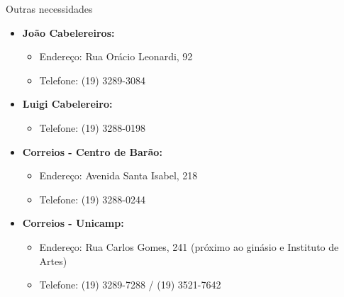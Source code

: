 \begin{story}{Outras necessidades}
\begin{itemize}
\item \textbf{João Cabelereiros:}
\begin{itemize}
\item Endereço: Rua Orácio Leonardi, 92
\item Telefone: (19) 3289-3084
\end{itemize}

\item \textbf{Luigi Cabelereiro:}
\begin{itemize}
\item Telefone: (19) 3288-0198
\end{itemize}

\item \textbf{Correios - Centro de Barão:}
\begin{itemize}
\item Endereço: Avenida Santa Isabel, 218
\item Telefone: (19) 3288-0244
\end{itemize}

\item \textbf{Correios - Unicamp:}
\begin{itemize}
\item Endereço: Rua Carlos Gomes, 241 (próximo ao ginásio e Instituto de Artes)
\item Telefone: (19) 3289-7288 / (19) 3521-7642
\end{itemize}

\end{itemize}

\end{story}

